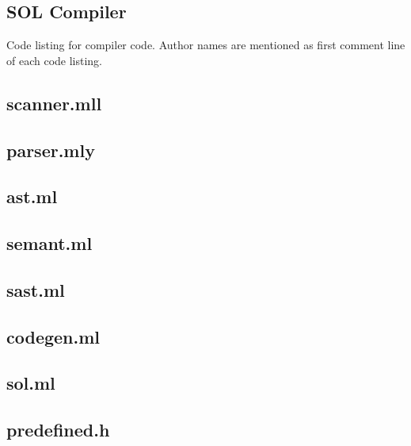 \documentclass[letterpaper,12pt]{report}
\begin{document}
\begin{appendices}

\chapter{SOL Compiler}

Code listing for compiler code. Author names are mentioned as first comment line of each code listing.

    \section{scanner.mll}
    

    \section{parser.mly}
    

    \section{ast.ml}
    

    \section{semant.ml}
    

    \section{sast.ml}
    

    \section{codegen.ml}
    

    \section{sol.ml}
    

    \section{predefined.h}
    


\end{appendices}
\end{document}
